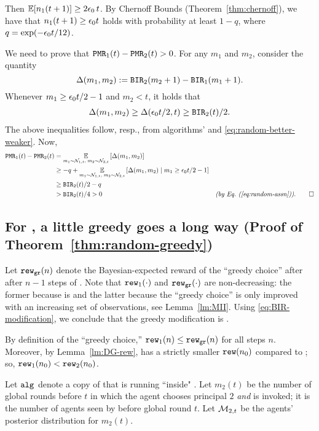 Then
    $\E[n_1(t+1)] \geq 2\eps_0\,t $.
By Chernoff Bounds (Theorem~\ref{thm:chernoff}), we have that
    $n_1(t+1)\geq \epsilon_0 t$
holds with probability at least $1-q$,
where $q = \exp(-\epsilon_0 t/12)$.

We need to prove that
    $\mathtt{PMR}_1(t) - \mathtt{PMR}_2(t)>0$.
For any $m_1$ and $m_2$, consider the quantity
\[ \Delta(m_1,m_2) := \mathtt{BIR}_2(m_2+1) - \mathtt{BIR}_1(m_1+1).\]
Whenever $m_1 \geq \epsilon_0 t/2 -1$ and $m_2<t$, it holds that
\begin{align*}
\Delta(m_1,m_2) \geq \Delta(\epsilon_0 t / 2, t)
    \geq \mathtt{BIR}_2(t)/2.
\end{align*}
The above inequalities follow, resp., from algorithms' \bmonotonicity and \eqref{eq:random-better-weaker}. Now,
\begin{align*}
\PMR_1(t) - \PMR_2(t)
    &= \Ex{m_1\sim \posteriorN{1}{t},\;m_2\sim \posteriorN{2}{t}}{\Delta(m_1,m_2)} \\
    &\geq -q
        + \Ex{m_1\sim \posteriorN{1}{t},\;m_2\sim \posteriorN{2}{t}}
            {\Delta(m_1,m_2)\mid m_1 \geq \eps_0 t/2-1} \\
    &\geq \BIR_2(t)/2-q \\
    &> \BIR_2(t)/4 > 0
    &\EqComment{by \refeq{eq:random-assn}}. \qedhere
\end{align*}

\subsection{For \HardMaxRandom, a little greedy goes a long way
(Proof of Theorem~\ref{thm:random-greedy})}
\label{sec:proofs-HMR-main}


  Let $\mathtt{rew}_{\texttt{gr}}(n)$ denote the Bayesian-expected reward of the ``greedy
  choice'' after after $n-1$ steps of \alg[1]. Note that
  $\mathtt{rew}_1(\cdot)$ and $\mathtt{rew}_{\texttt{gr}}(\cdot)$ are non-decreasing: the former
  because \alg[1] is \bmonotone and the latter because the ``greedy
  choice'' is only improved with an increasing set of
  observations, see Lemma~\ref{lm:MII}.
Using \eqref{eq:BIR-modification}, we conclude that
the greedy modification \alg[2] is \bmonotone.

  By definition of the ``greedy choice,'' $\mathtt{rew}_1(n)\leq \mathtt{rew}_{\texttt{gr}}(n)$
  for all steps $n$. Moreover, by Lemma~\ref{lm:DG-rew},
  \alg[1] has a strictly smaller $\mathtt{rew}(n_0)$ compared to \DynGreedy;
  so, $\mathtt{rew}_1(n_0)<\mathtt{rew}_2(n_0)$.

Let $\mathtt{alg}_{}$ denote a copy of \alg[1] that is running ``inside" \alg[2]. Let $m_2(t)$ be the number of global rounds before $t$ in which the agent chooses principal $2$ \emph{and} \alg is invoked; \ie it is the number of agents seen by \alg before global round $t$. Let $\mathcal{M}_{2,t}$ be the agents' posterior distribution for $m_2(t)$.

